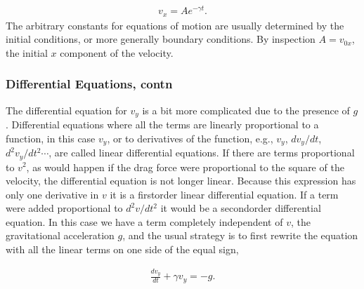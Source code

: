 \documentclass[letterpaper,10pt,english]{sphinxmanual}
\begin{document}
\begin{equation*}
\begin{split}
\begin{equation}
v_x=Ae^{-\gamma t}.
\label{_auto5} \tag{5}
\end{equation}
\end{split}
\end{equation*}
The arbitrary constants for equations of motion are usually determined
by the initial conditions, or more generally boundary conditions. By
inspection \(A=v_{0x}\), the initial \(x\) component of the velocity.


\subsubsection{Differential Equations, contn}
\label{\detokenize{chapter3:differential-equations-contn}}
The differential equation for \(v_y\) is a bit more complicated due to
the presence of \(g\). Differential equations where all the terms are
linearly proportional to a function, in this case \(v_y\), or to
derivatives of the function, e.g., \(v_y\), \(dv_y/dt\),
\(d^2v_y/dt^2\cdots\), are called linear differential equations. If
there are terms proportional to \(v^2\), as would happen if the drag
force were proportional to the square of the velocity, the
differential equation is not longer linear. Because this expression
has only one derivative in \(v\) it is a first\sphinxhyphen{}order linear differential
equation. If a term were added proportional to \(d^2v/dt^2\) it would be
a second\sphinxhyphen{}order differential equation.  In this case we have a term
completely independent of \(v\), the gravitational acceleration \(g\), and
the usual strategy is to first rewrite the equation with all the
linear terms on one side of the equal sign,




\begin{equation*}
\begin{split}
\begin{equation}
\frac{dv_y}{dt}+\gamma v_y=-g.
\label{_auto6} \tag{6}
\end{equation}
\end{split}
\end{equation*}
\end{document}
